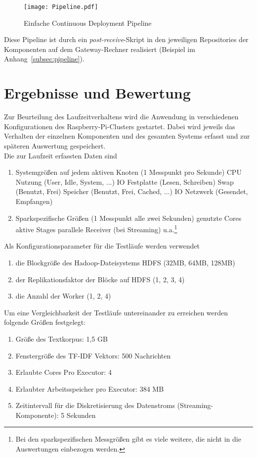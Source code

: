 \begin{figure}[ht!]
	\centering
  \texttt{[image: Pipeline.pdf]}
	\caption{Einfache Continuous Deployment Pipeline}
	\label{figure:cd_pipeline}
\end{figure}

Diese Pipeline ist durch ein \textit{post-receive}-Skript in den jeweiligen Repositories der Komponenten auf dem Gateway-Rechner realisiert (Beispiel im Anhang~\ref{subsec:pipeline}).\\


\section{Ergebnisse und Bewertung}

Zur Beurteilung des Laufzeitverhaltens wird die Anwendung in verschiedenen Konfigurationen des Raspberry-Pi-Clusters gestartet. Dabei wird jeweils das Verhalten der einzelnen Komponenten und des gesamten Systems erfasst und zur späteren Auswertung gespeichert.\\

Die zur Laufzeit erfassten Daten sind
\begin{enumerate}
	\item Systemgrößen auf jedem aktiven Knoten (1 Messpunkt pro Sekunde)
	\subitem CPU Nutzung (User, Idle, System, ...)
	\subitem IO Festplatte (Lesen, Schreiben)
	\subitem Swap (Benutzt, Frei)
	\subitem Speicher (Benutzt, Frei, Cached, ...)
	\subitem IO Netzwerk (Gesendet, Empfangen)
	\item Sparkspezifische Größen (1 Messpunkt alle zwei Sekunden)
	\subitem genutzte Cores
	\subitem aktive Stages
	\subitem parallele Receiver (bei Streaming)
	\subitem u.a.\footnote{Bei den sparkspezifischen Messgrößen gibt es viele weitere, die nicht in die Auswertungen einbezogen werden.}
\end{enumerate}

Als Konfigurationsparameter für die Testläufe werden verwendet
\begin{enumerate}
	\item die Blockgröße des Hadoop-Dateisystems HDFS (32MB, 64MB, 128MB)
	\item der Replikationsfaktor der Blöcke auf HDFS (1, 2, 3, 4)
	\item die Anzahl der Worker (1, 2, 4)
\end{enumerate}

Um eine Vergleichbarkeit der Testläufe untereinander zu erreichen werden folgende Größen festgelegt:
\begin{enumerate}
	\item Größe des Textkorpus: 1,5 GB
	\item Fenstergröße des TF-IDF Vektors: 500 Nachrichten
	\item Erlaubte Cores Pro Executor: 4
	\item Erlaubter Arbeitsspeicher pro Executor: 384 MB
	\item Zeitintervall für die Diskretisierung des Datenstroms (Streaming-Komponente): 5 Sekunden
\end{enumerate}

